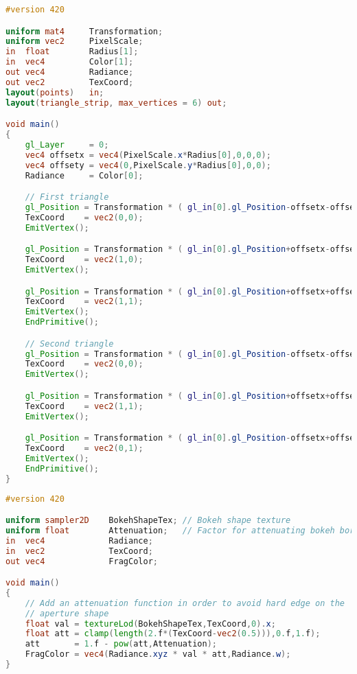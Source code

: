 \begin{lstlisting}[language=GLSL,float={htb},caption={Geometry shader for rendering bokeh.},label={YourName:listing1}]
#version 420

uniform mat4     Transformation;
uniform vec2     PixelScale;
in  float        Radius[1];
in  vec4         Color[1];
out vec4         Radiance;
out vec2         TexCoord;
layout(points)   in;
layout(triangle_strip, max_vertices = 6) out;

void main()
{
	gl_Layer     = 0;
	vec4 offsetx = vec4(PixelScale.x*Radius[0],0,0,0);
	vec4 offsety = vec4(0,PixelScale.y*Radius[0],0,0);
	Radiance     = Color[0];

	// First triangle
	gl_Position = Transformation * ( gl_in[0].gl_Position-offsetx-offsety);
	TexCoord    = vec2(0,0);
	EmitVertex();

	gl_Position = Transformation * ( gl_in[0].gl_Position+offsetx-offsety);
	TexCoord    = vec2(1,0);
	EmitVertex();

	gl_Position = Transformation * ( gl_in[0].gl_Position+offsetx+offsety);
	TexCoord    = vec2(1,1);
	EmitVertex();
	EndPrimitive();

	// Second triangle
	gl_Position = Transformation * ( gl_in[0].gl_Position-offsetx-offsety);
	TexCoord    = vec2(0,0);
	EmitVertex();

	gl_Position = Transformation * ( gl_in[0].gl_Position+offsetx+offsety);
	TexCoord    = vec2(1,1);
	EmitVertex();

	gl_Position = Transformation * ( gl_in[0].gl_Position-offsetx+offsety);
	TexCoord    = vec2(0,1);
	EmitVertex();
	EndPrimitive();
}
\end{lstlisting}

\begin{lstlisting}[language=GLSL,float={htb},caption={Fragment shader for rendering bokeh.},label={YourName:listing1}]
#version 420

uniform sampler2D    BokehShapeTex; // Bokeh shape texture
uniform float        Attenuation;   // Factor for attenuating bokeh borders
in  vec4             Radiance;
in  vec2             TexCoord;
out vec4             FragColor;

void main()
{
	// Add an attenuation function in order to avoid hard edge on the 
	// aperture shape
	float val = textureLod(BokehShapeTex,TexCoord,0).x;
	float att = clamp(length(2.f*(TexCoord-vec2(0.5))),0.f,1.f);
	att       = 1.f - pow(att,Attenuation);
	FragColor = vec4(Radiance.xyz * val * att,Radiance.w);
}
\end{lstlisting}


